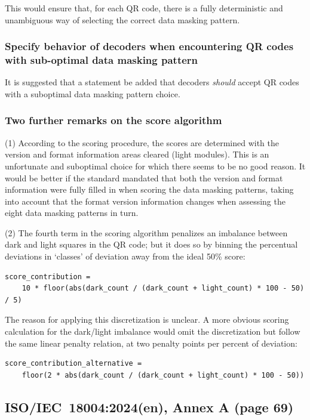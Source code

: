 \documentclass[a4paper,twoside]{article}
\newcommand{\shortstandard}{ISO/IEC~18004}
\newcommand{\standard}{\shortstandard:2024(en)}
\begin{document}
This would ensure that, for each QR code, there is a fully deterministic and unambiguous way of selecting the
correct data masking pattern.

\subsubsection*{Specify behavior of decoders when encountering QR codes with sub-optimal data masking pattern}

It is suggested that a statement be added that decoders \emph{should} accept QR codes with a suboptimal data masking
pattern choice.

\subsubsection*{Two further remarks on the score algorithm}

(1) According to the scoring procedure, the scores are determined with the version and format information areas
cleared (light modules). This is an unfortunate and suboptimal choice for which there seems to be no good reason.
It would be better if the standard mandated that both the version and format information were fully filled in when 
scoring the data masking patterns, taking into account that the format version information changes when assessing
the eight data masking patterns in turn.

(2) The fourth term in the scoring algorithm penalizes an imbalance between dark and light
squares in the QR code; but it does so by binning the percentual deviations in `classes' of
deviation away from the ideal 50\% score:

\begin{verbatim}
score_contribution =
    10 * floor(abs(dark_count / (dark_count + light_count) * 100 - 50) / 5)
\end{verbatim}

The reason for applying this discretization is unclear. A more obvious scoring calculation for the
dark/light imbalance would omit the discretization but follow the same linear penalty relation,
at two penalty points per percent of deviation:

\begin{verbatim}
score_contribution_alternative =
    floor(2 * abs(dark_count / (dark_count + light_count) * 100 - 50))
\end{verbatim}

\subsection{\standard, Annex A (page 69)}
\end{document}
